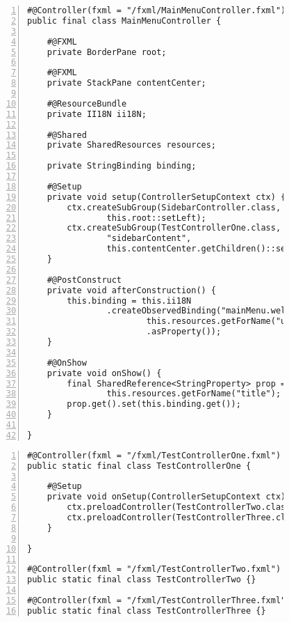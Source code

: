 \begin{figure}[H]
	\begin{lstlisting}[caption=Demo -- \texttt{MainMenuController}., captionpos=b, label=lst:mainmenu_controller, numbers=left, xleftmargin=1.7em, framexleftmargin=1.7em, nolol]
#@Controller(fxml = "/fxml/MainMenuController.fxml")
public final class MainMenuController {

    #@FXML
    private BorderPane root;

    #@FXML
    private StackPane contentCenter;

    #@ResourceBundle
    private II18N ii18N;

    #@Shared
    private SharedResources resources;

    private StringBinding binding;

    #@Setup
    private void setup(ControllerSetupContext ctx) {
        ctx.createSubGroup(SidebarController.class, "sidebar",
				this.root::setLeft);
        ctx.createSubGroup(TestControllerOne.class,
				"sidebarContent",
				this.contentCenter.getChildren()::setAll);
    }

    #@PostConstruct
    private void afterConstruction() {
        this.binding = this.ii18N
				.createObservedBinding("mainMenu.welcome",
						this.resources.getForName("username")
						.asProperty());
    }

    #@OnShow
    private void onShow() {
        final SharedReference<StringProperty> prop = 
				this.resources.getForName("title");
        prop.get().set(this.binding.get());
    }

}
	\end{lstlisting}
\end{figure}
\begin{figure}[H]
	\begin{lstlisting}[caption=Demo -- Alle \texttt{TestController}., captionpos=b, label=lst:test_controllers, numbers=left, xleftmargin=1.7em, framexleftmargin=1.7em, nolol]
#@Controller(fxml = "/fxml/TestControllerOne.fxml")
public static final class TestControllerOne {

    #@Setup
    private void onSetup(ControllerSetupContext ctx) {
        ctx.preloadController(TestControllerTwo.class);
        ctx.preloadController(TestControllerThree.class);
    }

}

#@Controller(fxml = "/fxml/TestControllerTwo.fxml")
public static final class TestControllerTwo {}

#@Controller(fxml = "/fxml/TestControllerThree.fxml")
public static final class TestControllerThree {}
	\end{lstlisting}
\end{figure}
